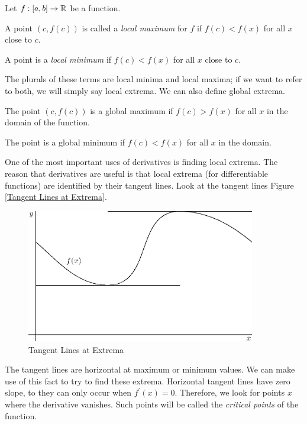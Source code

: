 \documentclass[fleqn]{report}
\begin{document}
Let $f: [a,b] \rightarrow \mathbb{R}$ be a function. 
\begin{smallitemize}
\item A point $(c,f(c))$ is called a \emph{local maximum} for
$f$ if $f(c) < f(x)$ for all $x$ close to $c$. 
\item A point is a \emph{local minimum} if $f(c) < f(x)$ for
all $x$ close to $c$. 
\end{smallitemize} 
The plurals of these terms are local minima and local maxima;
if we want to refer to both, we will simply say local extrema.
We can also define global extrema. 
\begin{smallitemize}
\item The point $(c,f(c))$ is a
global maximum if $f(c) > f(x)$ for all $x$ in the domain of
the function. 
\item The point is a global minimum if $f(c) < f(x)$
for all $x$ in the domain. 
\end{smallitemize}
One of the most important uses of derivatives is finding local
extrema. The reason that derivatives are useful is that local
extrema (for differentiable functions) are identified by their
tangent lines. Look at the tangent lines Figure \ref{Tangent
Lines at Extrema}.

\begin{figure}[ht]
\centering
\includegraphics[width=10cm]{figure54.eps}
\caption{Tangent Lines at Extrema}
\label{Tangent Lines at Extrema}
\end{figure}

The tangent lines are horizontal at maximum or minimum values.
We can make use of this fact to try to find these extrema.
Horizontal tangent lines have zero slope, to they can only
occur when $f^\prime(x) = 0$. Therefore, we look for points
$x$ where the derivative vanishes. Such points will be called
the \emph{critical points} of the function.
\end{document}
